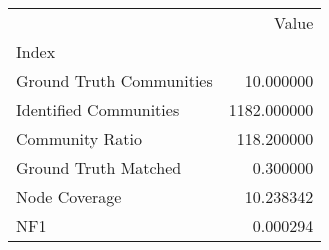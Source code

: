 \begin{tabular}{lr}
\toprule
{} &        Value \\
Index                    &              \\
\midrule
Ground Truth Communities &    10.000000 \\
Identified Communities   &  1182.000000 \\
Community Ratio          &   118.200000 \\
Ground Truth Matched     &     0.300000 \\
Node Coverage            &    10.238342 \\
NF1                      &     0.000294 \\
\bottomrule
\end{tabular}
